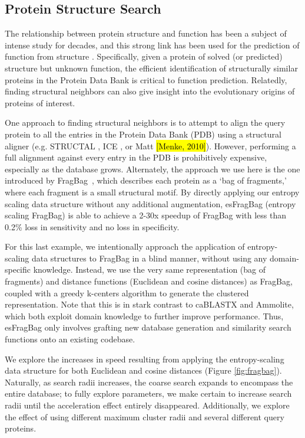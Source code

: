 \documentclass[review,preprint,12pt]{elsarticle}
\renewcommand{\cite}{\citep} %
\theoremstyle{definition}
\theoremstyle{remark}
\numberwithin{equation}{section}
\begin{document}
\subsection{Protein Structure Search}

The relationship between protein structure and function has been a subject of intense study for decades,
and this strong link has been used for the prediction of function from structure \cite{hegyi1999relationship}.
Specifically, given a protein of solved (or predicted) structure but unknown function, the efficient identification
of structurally similar proteins in the Protein Data Bank is critical to function prediction.
Relatedly, finding structural neighbors can also give insight into the evolutionary origins of proteins of interest.

One approach to finding structural neighbors is to attempt to align the query protein to all the entries in the Protein Data Bank (PDB) using a structural aligner (e.g. STRUCTAL \cite{subbiah1993structural}, ICE \cite{shindyalov1998protein}, or Matt \hl{[Menke, 2010]}).
However, performing a full alignment against every entry in the PDB is prohibitively expensive, especially as the database grows.
Alternately, the approach we use here is the one introduced by FragBag~\cite{budowski2010fragbag}, which describes each protein as a
`bag of fragments,' where each fragment is a small structural motif.
By directly applying our entropy scaling data structure without any additional augmentation, esFragBag (entropy scaling FragBag) is able to achieve a 2-30x speedup of FragBag with less than 0.2\% loss in sensitivity and no loss in specificity.

For this last example, we intentionally approach the application of entropy-scaling data structures to FragBag in a blind manner,
without using any domain-specific knowledge.
Instead, we use the very same representation (bag of fragments) and distance functions (Euclidean and cosine distances)
as FragBag, coupled with a greedy k-centers algorithm to generate the clustered representation.
Note that this is in stark contrast to caBLASTX and Ammolite, which both exploit domain knowledge to further improve performance.
Thus, esFragBag only involves grafting new database generation and similarity search functions onto an existing codebase.

We explore the increases in speed resulting from applying the entropy-scaling data structure for both Euclidean and cosine distances (Figure \ref{fig:fragbag}).
Naturally, as search radii increases, the coarse search expands to encompass the entire database; to fully explore parameters, we make certain to increase search radii until the acceleration effect entirely disappeared.
Additionally, we explore the effect of using different maximum cluster radii and several different query proteins.
\end{document}
